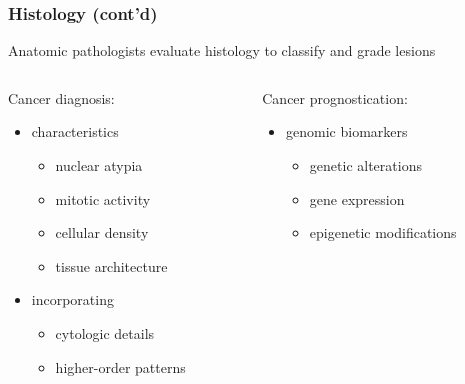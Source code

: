 \documentclass[usenames,dvipsnames]{beamer}
\begin{document}
\begin{frame}
  \frametitle{Histology (cont'd)}
  Anatomic pathologists evaluate histology to classify and grade lesions
  \vspace{0.5cm}
  \begin{columns}[t]
    \begin{column}{.48\textwidth}
      Cancer diagnosis:
      \begin{itemize}
        \item characteristics
          \begin{itemize}
            \item nuclear atypia
            \item mitotic activity
            \item cellular density
            \item tissue architecture
          \end{itemize}
        \item incorporating
          \begin{itemize}
            \item cytologic details
            \item higher-order patterns
          \end{itemize}
      \end{itemize}
    \end{column}
    \begin{column}{.48\textwidth}
      Cancer prognostication:
      \begin{itemize}
        \item genomic biomarkers
          \begin{itemize}
            \item genetic alterations
            \item gene expression
            \item epigenetic modifications
          \end{itemize}
      \end{itemize}
    \end{column}
  \end{columns}
\end{frame}
\end{document}
